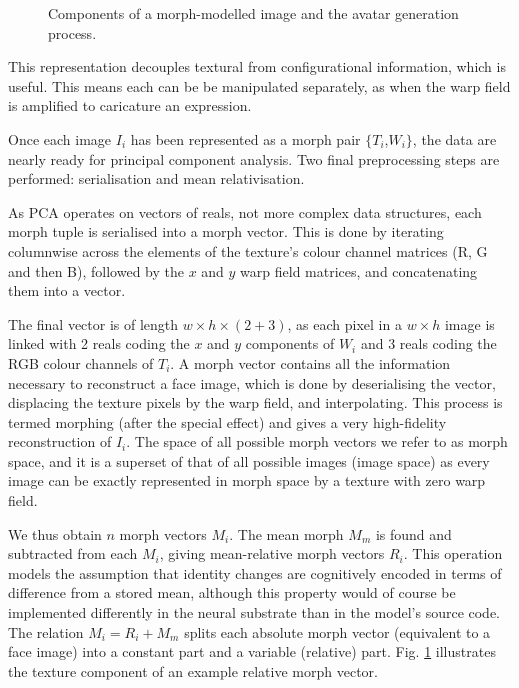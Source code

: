 \documentclass[runningheads]{llncs}
\begin{document}
\begin{figure}[htp]
{	}
	
		\hspace{0.5cm}
	\caption{Components of a morph-modelled image and the avatar generation process.}
	\label{fig:subfigureExample1}
	\end{figure}




This representation decouples textural from configurational information, which is  useful. This means each can be be manipulated separately, as when the warp field is amplified to caricature an expression\cite{brennan1985caricature}.

Once each image $I_i$ has been represented as a morph pair  $\{T_i$,$W_i\}$, the data are nearly ready for principal component analysis. Two final preprocessing steps are performed: serialisation and mean relativisation.

As PCA operates on vectors of reals,  not more complex data structures, each morph tuple is serialised into a morph vector. This is done by iterating columnwise across the elements of the texture's colour channel matrices (R, G and then B), followed by the $x$ and $y$ warp field matrices, and  concatenating them into a vector.

The final vector is of length $w \times h \times (2 + 3)$, as each pixel in a $w \times h$ image is linked with 2 reals coding the $x$ and $y$ components of $W_i$ and 3 reals coding the RGB colour channels of $T_i$. A morph vector contains all the information necessary to reconstruct a face image, which is done by deserialising the vector, displacing the texture pixels by the warp field, and interpolating. This process is termed morphing (after the special effect\cite{rotshtein2004morphing}) and gives a very high-fidelity reconstruction of $I_i$.  The space of all possible morph vectors we refer to  as morph space, and it is a superset of that of all possible images (image space) as every image can be exactly represented in morph space by a texture with zero warp field.

We thus obtain $n$ morph vectors $M_i$. The mean morph $M_m$ is found and subtracted from each $M_i$, giving mean-relative morph vectors $R_i$. This operation models the assumption that identity changes are cognitively encoded in terms of difference from a stored mean, although this property would of course be implemented differently in the neural substrate than in the model's source code.
The relation $M_i = R_i + M_m$ splits each absolute morph vector (equivalent to a face image) into a constant part and a variable (relative) part. Fig. \ref{fig:subfigureExample1} illustrates the texture component of an example relative morph vector.
\end{document}
